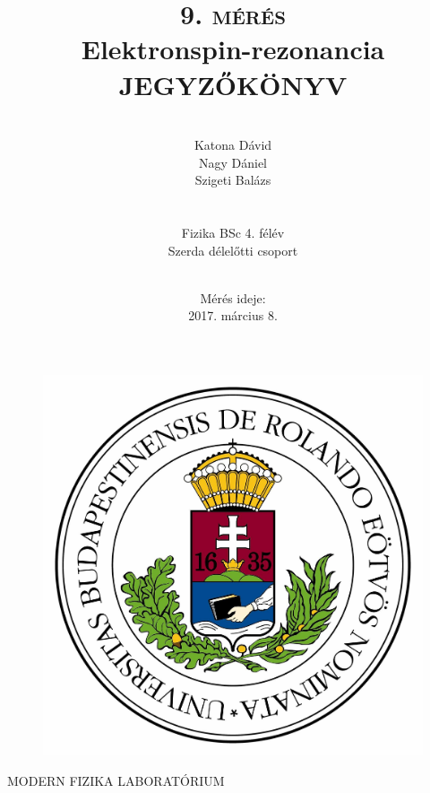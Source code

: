 \documentclass[a4paper,12pt]{article}
\begin{document}
        \begin{titlepage}
\author{\\ Katona Dávid  \\
Nagy Dániel \\
Szigeti Balázs \\\\\\
Fizika BSc 4. félév\\
Szerda délelőtti csoport\\\\
}

\title{\textsc{9. mérés} \\
\huge{\textbf{Elektronspin-rezonancia}\\
\vspace{10pt}\textsc{JEGYZŐKÖNYV}}}
\date{Mérés ideje:\\2017. március 8. \\
}

\centering
\maketitle
        \thispagestyle{empty}

\begin{figure}[h!]
\centering
\includegraphics[scale=0.05]{eltelogo}
\end{figure}

\small{MODERN FIZIKA LABORATÓRIUM}
        \end{titlepage}
\end{document}
